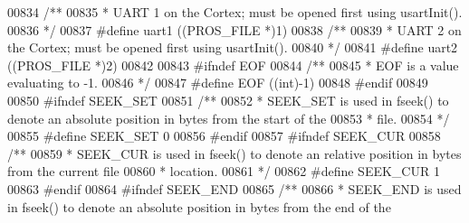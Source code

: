 \begin{DoxyCode}
00834 \textcolor{comment}{/**}
00835 \textcolor{comment}{ * UART 1 on the Cortex; must be opened first using usartInit().}
00836 \textcolor{comment}{ */}
00837 \textcolor{preprocessor}{#}\textcolor{preprocessor}{define} \textcolor{preprocessor}{uart1} \textcolor{preprocessor}{(}\textcolor{preprocessor}{(}\textcolor{preprocessor}{PROS\_FILE} \textcolor{preprocessor}{*}\textcolor{preprocessor}{)}1\textcolor{preprocessor}{)}
00838 \textcolor{comment}{/**}
00839 \textcolor{comment}{ * UART 2 on the Cortex; must be opened first using usartInit().}
00840 \textcolor{comment}{ */}
00841 \textcolor{preprocessor}{#}\textcolor{preprocessor}{define} \textcolor{preprocessor}{uart2} \textcolor{preprocessor}{(}\textcolor{preprocessor}{(}\textcolor{preprocessor}{PROS\_FILE} \textcolor{preprocessor}{*}\textcolor{preprocessor}{)}2\textcolor{preprocessor}{)}
00842 
00843 \textcolor{preprocessor}{#}\textcolor{preprocessor}{ifndef} \textcolor{preprocessor}{EOF}
00844 \textcolor{comment}{/**}
00845 \textcolor{comment}{ * EOF is a value evaluating to -1.}
00846 \textcolor{comment}{ */}
00847 \textcolor{preprocessor}{#}\textcolor{preprocessor}{define} \textcolor{preprocessor}{EOF} \textcolor{preprocessor}{(}\textcolor{preprocessor}{(}\textcolor{keywordtype}{int}\textcolor{preprocessor}{)}\textcolor{preprocessor}{-}1\textcolor{preprocessor}{)}
00848 \textcolor{preprocessor}{#}\textcolor{preprocessor}{endif}
00849 
00850 \textcolor{preprocessor}{#}\textcolor{preprocessor}{ifndef} \textcolor{preprocessor}{SEEK\_SET}
00851 \textcolor{comment}{/**}
00852 \textcolor{comment}{ * SEEK\_SET is used in fseek() to denote an absolute position in bytes from the start of the}
00853 \textcolor{comment}{ * file.}
00854 \textcolor{comment}{ */}
00855 \textcolor{preprocessor}{#}\textcolor{preprocessor}{define}       \textcolor{preprocessor}{SEEK\_SET} 0
00856 \textcolor{preprocessor}{#}\textcolor{preprocessor}{endif}
00857 \textcolor{preprocessor}{#}\textcolor{preprocessor}{ifndef} \textcolor{preprocessor}{SEEK\_CUR}
00858 \textcolor{comment}{/**}
00859 \textcolor{comment}{ * SEEK\_CUR is used in fseek() to denote an relative position in bytes from the current file}
00860 \textcolor{comment}{ * location.}
00861 \textcolor{comment}{ */}
00862 \textcolor{preprocessor}{#}\textcolor{preprocessor}{define}       \textcolor{preprocessor}{SEEK\_CUR} 1
00863 \textcolor{preprocessor}{#}\textcolor{preprocessor}{endif}
00864 \textcolor{preprocessor}{#}\textcolor{preprocessor}{ifndef} \textcolor{preprocessor}{SEEK\_END}
00865 \textcolor{comment}{/**}
00866 \textcolor{comment}{ * SEEK\_END is used in fseek() to denote an absolute position in bytes from the end of the}

\end{DoxyCode}

